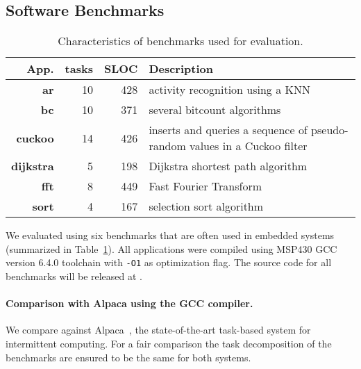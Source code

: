 \subsection{Software Benchmarks}
\label{sec:software_benchmarks}

\begin{table}
	\centering
	\footnotesize
	\begin{tabular}{| r|r|r | p{} |}
		\hline
		App.&tasks&SLOC&Description\\
		\hline\hline
        \textbf{ar} &10 &428 & activity recognition using a KNN\\ %
		\hline
        \textbf{bc} &10 &371 & several bitcount algorithms\\
		\hline
        \textbf{cuckoo} &14 &426 & inserts and queries a sequence of pseudo-random
values in a Cuckoo filter\\
		\hline
        \textbf{dijkstra} &5 &198 & Dijkstra shortest path algorithm \\
		\hline
        \textbf{fft} &8 &449 & Fast Fourier Transform\\ %
		\hline
		\textbf{sort} &4 &167 & selection sort algorithm\\
		\hline
	\end{tabular}
\caption{Characteristics of benchmarks used for evaluation.}
\label{table:benchmark_table}
\end{table}

We evaluated \sys using six benchmarks that are often used in embedded systems (summarized in Table~\ref{table:benchmark_table}). All applications were compiled using MSP430 GCC~\cite{ti-gcc} version 6.4.0 toolchain with \texttt{-O1} as optimization flag. The source code for all benchmarks will be released at \cite{coala_website}.

\paragraph{Comparison with Alpaca using the GCC compiler.}

We compare \sys against Alpaca~\cite{alpaca}, the state-of-the-art task-based system for intermittent computing. For a fair comparison the task decomposition of the benchmarks are ensured to be the same for both systems.

